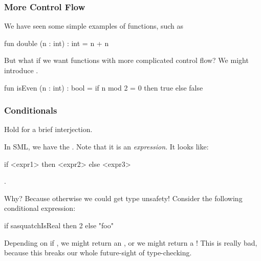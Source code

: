 \documentclass[aspectratio=169]{beamer}
\begin{document}
\begin{frame}[fragile]
  \frametitle{More Control Flow}

  We have seen some simple examples of
  functions, such as
  \begin{codeblock}
    fun double (n : int) : int = n + n
  \end{codeblock}

  \pause
  \vspace{\fill}

  But what if we want functions with more complicated control flow? We might introduce
  .

  \begin{codeblock}
    fun isEven (n : int) : bool =
      if n mod 2 = 0 then true
      else false
  \end{codeblock}

  \pause
  \vspace{\fill}

\end{frame}

\begin{frame}[fragile]
  \frametitle{Conditionals}

  Hold for a brief interjection.

  \pause
  \vspace{\fill}

  In SML, we have the . Note that it is an \textit{expression}. It looks like:
  \begin{codeblock}
    if <expr1> then <expr2> else <expr3>
  \end{codeblock}

  \pause
  \vspace{\fill}

  .

  \pause
  \vspace{\fill}

  Why? Because otherwise we could get type unsafety! Consider the following conditional
  expression:
  \begin{codeblock}
    if sasquatchIsReal then 2 else "foo"
  \end{codeblock}

  \pause
  \vspace{\fill}

  Depending on if , we might return an , or we might return
  a ! This is really bad, because this breaks our whole future-sight of
  type-checking.
\end{frame}
\end{document}
